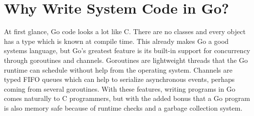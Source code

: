 
\chapter{Why Write System Code in Go?}

At first glance, Go code looks a lot like C. There are no
classes and every object has a type which is known at compile time.
This already makes Go a good systems language, but Go's
greatest feature is its built-in support for concurrency through
goroutines and channels. Goroutines are lightweight threads that
the Go runtime can schedule without help from the operating system.
Channels are typed FIFO queues which can help to serialize
asynchronous events, perhaps coming from several goroutines.
With these features, writing programs in Go comes naturally to C
programmers, but with the added bonus that a Go program is also
memory safe because of runtime checks and a garbage collection system.


